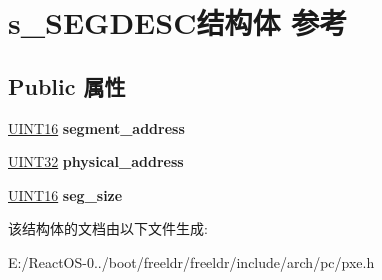 \hypertarget{structs___s_e_g_d_e_s_c}{}\section{s\+\_\+\+S\+E\+G\+D\+E\+S\+C结构体 参考}
\label{structs___s_e_g_d_e_s_c}
\subsection*{Public 属性}
\begin{DoxyCompactItemize}
\item 
\mbox{\label{structs___s_e_g_d_e_s_c_a9ab9b50fdc4b2b302cd3d4e1a64fd9cb}} 
\hyperlink{_processor_bind_8h_a09f1a1fb2293e33483cc8d44aefb1eb1}{U\+I\+N\+T16} {\bfseries segment\+\_\+address}
\item 
\mbox{\label{structs___s_e_g_d_e_s_c_afe9fa6e54f7d288b88b298c13c973afc}} 
\hyperlink{_processor_bind_8h_ae1e6edbbc26d6fbc71a90190d0266018}{U\+I\+N\+T32} {\bfseries physical\+\_\+address}
\item 
\mbox{\label{structs___s_e_g_d_e_s_c_ac517cd0544e3184a725103991a56b1e1}} 
\hyperlink{_processor_bind_8h_a09f1a1fb2293e33483cc8d44aefb1eb1}{U\+I\+N\+T16} {\bfseries seg\+\_\+size}
\end{DoxyCompactItemize}


该结构体的文档由以下文件生成\+:\begin{DoxyCompactItemize}
\item 
E\+:/\+React\+O\+S-\/0../boot/freeldr/freeldr/include/arch/pc/pxe.\+h\end{DoxyCompactItemize}
